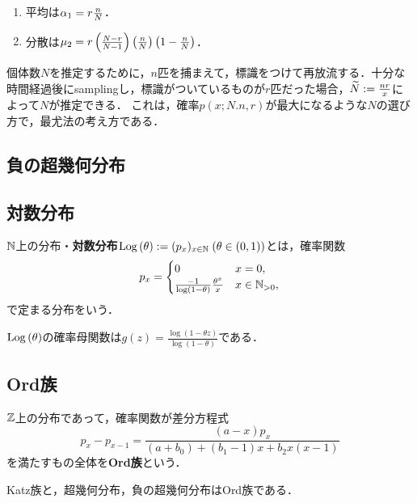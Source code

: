 \documentclass[uplatex,dvipdfmx]{jsreport}
\begin{document}
\begin{proposition}\mbox{}
    \begin{enumerate}
        \item 平均は$\alpha_1=r\frac{n}{N}$．
        \item 分散は$\mu_2=r\left(\frac{N-r}{N-1}\right)\left(\frac{n}{N}\right)\left(1-\frac{n}{N}\right)$．
    \end{enumerate}
\end{proposition}

\begin{example}
    個体数$N$を推定するために，$n$匹を捕まえて，標識をつけて再放流する．十分な時間経過後にsamplingし，標識がついているものが$r$匹だった場合，$\widetilde{N}:=\frac{nr}{x}$によって$N$が推定できる．
    これは，確率$p(x;N.n,r)$が最大になるような$N$の選び方で，最尤法の考え方である．
\end{example}

\subsection{負の超幾何分布}

\subsection{対数分布}

\begin{definition}
    $\mathbb{N}$上の分布・\textbf{対数分布}$\mathrm{Log}\,(\theta):=(p_x)_{x\in\mathbb{N}}\;(\theta\in(0,1))$とは，確率関数
    \[p_x=\begin{cases}
        0&x=0,\\
        \frac{-1}{\log(1-\theta)}\frac{\theta^x}{x}&x\in\mathbb{N}_{>0},
    \end{cases}\]
    で定まる分布をいう．
\end{definition}

\begin{proposition}
    $\mathrm{Log}\,(\theta)$の確率母関数は$g(z)=\frac{\log(1-\theta z)}{\log(1-\theta)}$である．
\end{proposition}

\subsection{Ord族}

\begin{definition}
    $\mathbb{Z}$上の分布であって，確率関数が差分方程式
    \[p_x-p_{x-1}=\frac{(a-x)p_x}{(a+b_0)+(b_1-1)x+b_2x(x-1)}\]
    を満たすもの全体を\textbf{Ord族}という．
\end{definition}
\begin{example}
    Katz族と，超幾何分布，負の超幾何分布はOrd族である．
\end{example}
\end{document}
